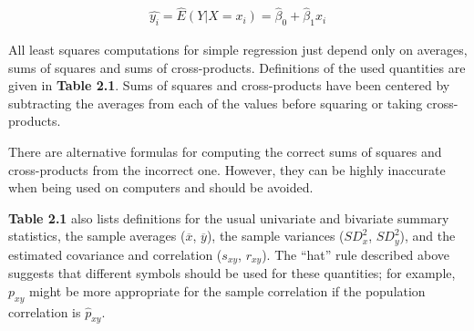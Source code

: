 \documentclass{article}
\begin{document}
    \begin{align}
        \hat{y _{i}} = \hat{E}(Y|X=x _{i}) = \hat{\beta} _{0} + \hat{\beta} _{1} x _{i}
    \end{align}

    All least squares computations for simple regression just depend only on averages, sums of squares and sums of cross-products. Definitions of the used quantities are given in \textbf{Table 2.1}. Sums of squares and cross-products have been centered by subtracting the averages from each of the values before squaring or taking cross-products. 
    
    There are alternative formulas for computing the correct sums of squares and cross-products from the incorrect one. However, they can be highly inaccurate when being used on computers and should be avoided. 
        
    \textbf{Table 2.1} also lists definitions for the usual univariate and bivariate summary statistics, the sample averages ($\overline{x}$, $\overline{y}$), the sample variances ($SD_{x}^2$, $SD_{y}^2$), and the estimated covariance and correlation ($s_{xy}$, $r_{xy}$). The “hat” rule described above suggests that different symbols should be used for these quantities; for example, $p_{xy}$ might be more appropriate for the sample correlation if the population correlation is $\hat{p}_{xy}$.
    
\end{document}
